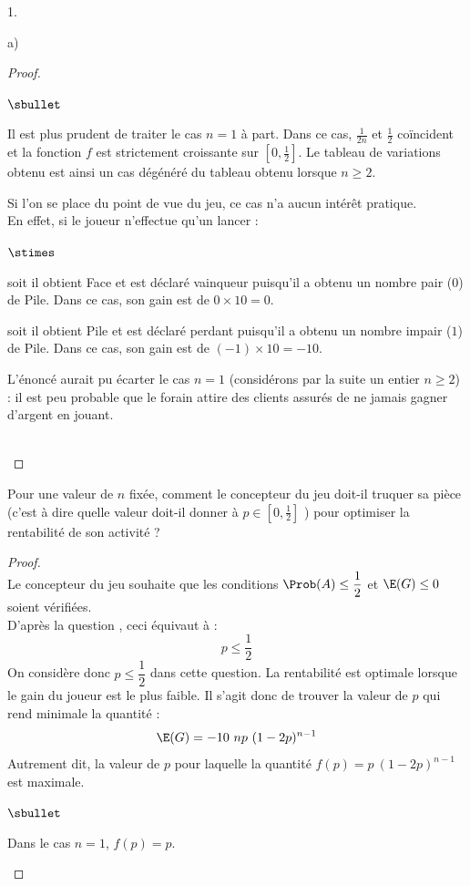 \documentclass[11pt]{article}%
\begin{document}
\begin{noliste}{1.}
\begin{noliste}{a)}
\begin{proof}
    \newpage


    \begin{remarkL}{.92}%
      \begin{noliste}{$\sbullet$}
      \item Il est plus prudent de traiter le cas $n = 1$ à part. Dans
        ce cas, $\frac{1}{2n}$ et $\frac{1}{2}$ coïncident et la
        fonction $f$ est strictement croissante sur $[0,
        \frac{1}{2}]$. Le tableau de variations obtenu est ainsi un
        cas dégénéré du tableau obtenu lorsque $n \geq 2$.
      \item Si l'on se place du point de vue du jeu, ce cas n'a aucun
        intérêt pratique. \\
        En effet, si le joueur n'effectue qu'un lancer :
        \begin{noliste}{$\stimes$}
        \item soit il obtient Face et est déclaré vainqueur puisqu'il
          a obtenu un nombre pair ($0$) de Pile. Dans ce cas, son gain
          est de $0 \times 10 = 0$.
        \item soit il obtient Pile et est déclaré perdant puisqu'il a
          obtenu un nombre impair ($1$) de Pile. Dans ce cas, son gain
          est de $(-1) \times 10 = -10$.
        \end{noliste}
        L'énoncé aurait pu écarter le cas $n = 1$ (\og considérons par
        la suite un entier $n \geq 2$\fg{}) : il est peu probable que
        le forain attire des clients assurés de ne jamais gagner
        d'argent en jouant.
      \end{noliste}
    \end{remarkL}~\\[-1.4cm]
  \end{proof}

  \item Pour une valeur de $n$ fixée, comment le concepteur du jeu
    doit-il truquer sa pièce (c'est à dire quelle valeur doit-il
    donner à $p \in \left[0, \frac{1}{2} \right]$ ) pour optimiser la
    rentabilité de son activité ?

    \begin{proof}~\\%
      Le concepteur du jeu souhaite que les conditions $\Prob(A) \leq
      \dfrac{1}{2}$ et $\E(G) \leq 0$ soient vérifiées.\\
      D'après la question , ceci équivaut à :
      \[
      p \leq \dfrac{1}{2}
      \]
      On considère donc $p \leq \dfrac{1}{2}$ dans cette question. La
      rentabilité est optimale lorsque le gain du joueur est le plus
      faible. Il s'agit donc de trouver la valeur de $p$ qui rend
      minimale la quantité : 
      \[
      \E(G) = -10 \ np \ (1-2p)^{n-1}
      \]
      Autrement dit, la valeur de $p$ pour laquelle la quantité $f(p)
      = p \ (1-2p)^{n-1}$ est maximale.
      \begin{noliste}{$\sbullet$}
      \item Dans le cas $n = 1$, $f(p) = p$. %
        

\end{noliste}
\end{proof}
\end{noliste}
\end{noliste}
\end{document}
